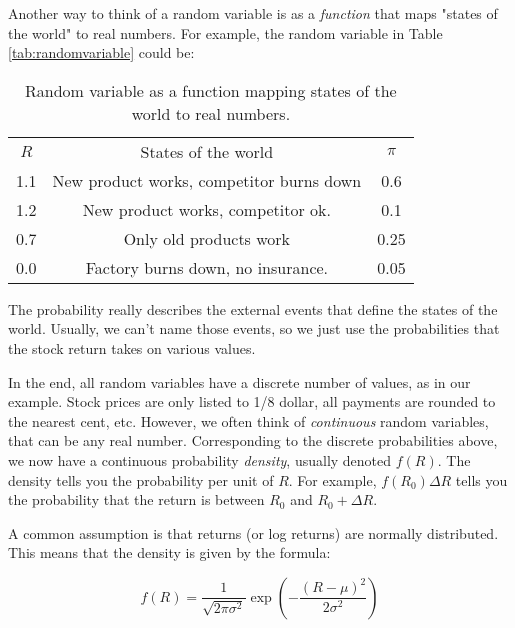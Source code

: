 Another way to think of a random variable is as a
\textit{function} that maps "states of the world" to
real numbers. For example, the random variable in 
Table \ref{tab:randomvariable} could be:

\begin{table}[!htbp]
    \centering
    \begin{tabular}{c c c}
        $R$ & States of the world & $\pi$ \\
        1.1 & New product works, competitor burns down & 0.6 \\
        1.2 & New product works, competitor ok. & 0.1 \\
        0.7 & Only old products work & 0.25 \\
        0.0 & Factory burns down, no insurance. & 0.05 \\
    \end{tabular}
    \caption{Random variable as a function mapping states of the world to real numbers.}
    \label{tab:statesoftheworld}
\end{table}

The probability really describes the external events 
that define the states of the world. Usually, we 
can't name those events, so we just use the probabilities
that the stock return takes on various values.

In the end, all random variables have a discrete number of values,
as in our example. Stock prices are only listed to 
1/8 dollar, all payments are rounded to the nearest cent, etc.
However, we often think of \textit{continuous} random variables,
that can be any real number. 
Corresponding to the discrete probabilities above,
we now have a continuous probability \textit{density},
usually denoted $f(R)$. 
The density tells you the probability per unit of $R$.
For example, $f(R_0)\Delta R$ tells you the probability
that the return is between $R_0$ and $R_0 + \Delta R$.

A common assumption is that returns (or log returns) are 
normally distributed. This means that the density is
given by the formula:

\begin{equation}
    f(R) = \frac{1}{\sqrt{2\pi\sigma^2}}\exp\left(-\frac{(R-\mu)^2}{2\sigma^2}\right)
\end{equation}

